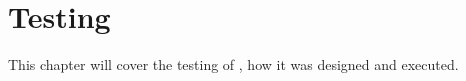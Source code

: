 \chapter{Testing}
This chapter will cover the testing of \projectname{}, how it was designed and executed. 




